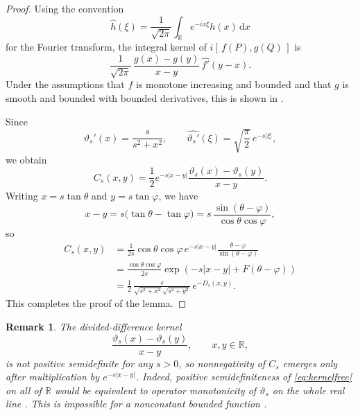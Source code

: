 \documentclass[10pt,a4paper]{amsart}
\newtheorem{remark}[theorem]{Remark}
\newcommand{\R}{\mathbb{R}}
\newcommand{\abs}[1]{\left\lvert #1\right\rvert}
\newcommand{\dd}{\,\mathrm{d}}
\begin{document}
\begin{proof}
Using the convention
\begin{equation}\label{eq:Fourier-convention}
\widehat h(\xi)=\frac{1}{\sqrt{2\pi}}
\int_{\R}e^{-ix\xi}h(x)\dd x
\end{equation}
for the Fourier transform, the integral kernel of
$i[\,f(P),g(Q)\,]$ is
\begin{equation}\label{eq:general-kernel}
\frac{1}{\sqrt{2\pi}}\,
\frac{g(x)-g(y)}{x-y}\,\widehat{f'}(y-x).
\end{equation}
Under the assumptions that $f$ is monotone increasing and bounded and
that $g$ is smooth and bounded with bounded derivatives, this is shown
in \cite[Lemma~3.3]{HerbstKriete}.

Since
\[
\vartheta_s'(x)=\frac{s}{s^2+x^2},
\qquad
\widehat{\vartheta_s'}(\xi)=\sqrt{\frac\pi2}\,e^{-s|\xi|},
\]
we obtain
\begin{equation}\label{eq:Cs-kernel}
C_s(x,y)=\frac12e^{-s\abs{x-y}}
\frac{\vartheta_s(x)-\vartheta_s(y)}{x-y}.
\end{equation}
Writing $x=s\tan\theta$ and $y=s\tan\varphi$, we have
\begin{equation}\label{eq:tan-difference}
x-y=s\bigl(\tan\theta-\tan\varphi\bigr)
=s\,\frac{\sin(\theta-\varphi)}{\cos\theta\cos\varphi},
\end{equation}
so
\begin{align*}
C_s(x,y)
&=\frac{1}{2s}\cos\theta\cos\varphi\,e^{-s\abs{x-y}}
\frac{\theta-\varphi}{\sin(\theta-\varphi)}\\
&=\frac{\cos\theta\cos\varphi}{2s}
\exp\!\left(-s\abs{x-y}+F(\theta-\varphi)\right)\\
&=\frac12\,
\frac{s}{\sqrt{s^2+x^2}\sqrt{s^2+y^2}}\,e^{-D_s(x,y)}.
\end{align*}
This completes the proof of the lemma.
\end{proof}

\begin{remark}
The divided-difference kernel
\begin{equation}\label{eq:kernelfree}
\frac{\vartheta_s(x)-\vartheta_s(y)}{x-y},
\qquad x,y\in\R,
\end{equation}
is not positive semidefinite for any $s>0$, so nonnegativity of
$C_s$ emerges only after multiplication by $e^{-s\abs{x-y}}$.  Indeed,
positive semidefiniteness of \eqref{eq:kernelfree} on all of $\R$ would
be equivalent to operator monotonicity of $\vartheta_s$ on the whole
real line \cite[Theorem~5.1]{Simon2}.  This is
impossible for a nonconstant bounded function
\cite[Theorem~1.1]{Simon2}.
\end{remark}
\end{document}

